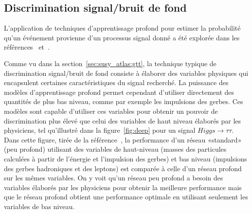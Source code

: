 \subsection{Discrimination signal/bruit de fond}
\label{sec:susy_atlas:dl:evt}

L'application de techniques d'apprentissage profond pour estimer la
probabilité qu'un événement provienne d'un processus signal donné a
été explorée dans les références~\cite{baldi_enhanced_2015} et~\cite{baldi_searching_2014}.

Comme vu dans la section~\ref{sec:susy_atlas:gtt}, la technique typique de discrimination
signal/bruit de fond consiste à élaborer des variables physiques qui
encapsulent certaines caractéristiques du signal recherché. La
puissance des modèles d'apprentissage profond permet cependant
d'utiliser directement des quantités de plus bas niveau, comme par
exemple les impulsions des gerbes. Ces modèles sont capable d'utiliser
ces variables pour obtenir un pouvoir de discrimination plus élevé que
celui des variables de haut niveau élaborés par les physiciens, tel
qu'illustré dans la figure~\ref{fig:deep} pour un signal
$Higgs \rightarrow\tau\tau$.  Dans cette figure, tirée de la
référence~\cite{baldi_searching_2014}, la performance d'un réseau
«standard» (peu profond) utilisant des variables de haut-niveau
(masses des particules calculées à partir de l'énergie et l'impulsion
des gerbes) et bas niveau (impulsions des gerbes hadroniques et des
leptons) est comparée à celle d'un réseau profond sur les mêmes
variables. On y voit qu'un réseau peu profond a besoin des variables
élaborés par les physiciens pour obtenir la meilleure performance mais
que le réseau profond obtient une performance optimale en
utilisant seulement les variables de bas niveau.

